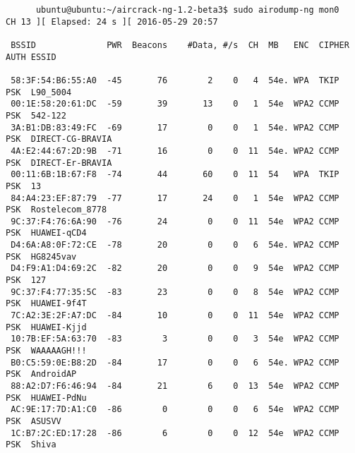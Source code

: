 \documentclass[10pt,a4paper]{report}
\begin{document}
		\begin{lstlisting}
      ubuntu@ubuntu:~/aircrack-ng-1.2-beta3$ sudo airodump-ng mon0
CH 13 ][ Elapsed: 24 s ][ 2016-05-29 20:57                                         
                                                                                                                                               
 BSSID              PWR  Beacons    #Data, #/s  CH  MB   ENC  CIPHER AUTH ESSID
                                                                                                                                               
 58:3F:54:B6:55:A0  -45       76        2    0   4  54e. WPA  TKIP   PSK  L90_5004                                                             
 00:1E:58:20:61:DC  -59       39       13    0   1  54e  WPA2 CCMP   PSK  542-122                                                              
 3A:B1:DB:83:49:FC  -69       17        0    0   1  54e. WPA2 CCMP   PSK  DIRECT-CG-BRAVIA                                                     
 4A:E2:44:67:2D:9B  -71       16        0    0  11  54e. WPA2 CCMP   PSK  DIRECT-Er-BRAVIA                                                     
 00:11:6B:1B:67:F8  -74       44       60    0  11  54   WPA  TKIP   PSK  13                                                                   
 84:A4:23:EF:87:79  -77       17       24    0   1  54e  WPA2 CCMP   PSK  Rostelecom_8778                                                      
 9C:37:F4:76:6A:90  -76       24        0    0  11  54e  WPA2 CCMP   PSK  HUAWEI-qCD4                                                          
 D4:6A:A8:0F:72:CE  -78       20        0    0   6  54e. WPA2 CCMP   PSK  HG8245vav                                                            
 D4:F9:A1:D4:69:2C  -82       20        0    0   9  54e  WPA2 CCMP   PSK  127                                                                  
 9C:37:F4:77:35:5C  -83       23        0    0   8  54e  WPA2 CCMP   PSK  HUAWEI-9f4T                                                          
 7C:A2:3E:2F:A7:DC  -84       10        0    0  11  54e  WPA2 CCMP   PSK  HUAWEI-Kjjd                                                          
 10:7B:EF:5A:63:70  -83        3        0    0   3  54e  WPA2 CCMP   PSK  WAAAAAGH!!!                                                          
 B0:C5:59:0E:B8:2D  -84       17        0    0   6  54e. WPA2 CCMP   PSK  AndroidAP                                                            
 88:A2:D7:F6:46:94  -84       21        6    0  13  54e  WPA2 CCMP   PSK  HUAWEI-PdNu                                                          
 AC:9E:17:7D:A1:C0  -86        0        0    0   6  54e  WPA2 CCMP   PSK  ASUSVV                                                               
 1C:B7:2C:ED:17:28  -86        6        0    0  12  54e  WPA2 CCMP   PSK  Shiva                                                                
                                                                                                                                                

\end{lstlisting}
\end{document}
